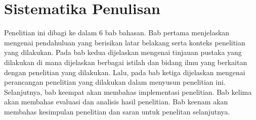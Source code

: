 \section{Sistematika Penulisan}
\label{sec:sistematika-penulisan}

Penelitian ini dibagi ke dalam 6 bab bahasan. Bab pertama menjelaskan mengenai pendahuluan yang
berisikan latar belakang serta konteks penelitian yang dilakukan. Pada bab kedua dijelaskan mengenai
tinjauan pustaka yang dilakukan di mana dijelaskan berbagai istilah dan bidang ilmu yang berkaitan
dengan penelitian yang dilakukan. Lalu, pada bab ketiga dijelaskan mengenai perancangan penelitian
yang dilakukan dalam menyusun penelitian ini. Selanjutnya, bab keempat akan membahas implementasi
penelitian. Bab kelima akan membahas evaluasi dan analisis hasil penelitian. Bab keenam akan
membahas kesimpulan penelitian dan saran untuk penelitan selanjutnya.
